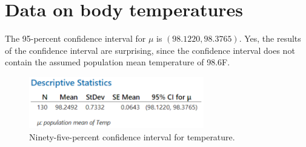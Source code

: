 \documentclass[12pt]{article}
\newcommand{\degreeF}{\degree F}
\begin{document}
\section{Data on body temperatures}
The 95-percent confidence interval for $\mu$ is $(98.1220, 98.3765)$. Yes, the results of the confidence interval are surprising, since the confidence interval does not contain the assumed population mean temperature of 98.6\degreeF.
\begin{figure}[h]
\begin{center}
\includegraphics[width=3in]{images/temperature-confidence-interval.png}
\end{center}
\caption{Ninety-five-percent confidence interval for temperature.}
\end{figure}
\end{document}
